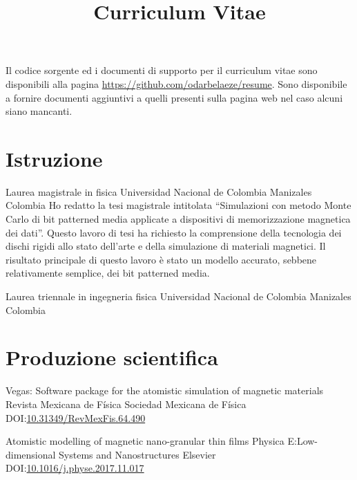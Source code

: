 \documentclass[12pt,english]{moderncv}
\title{Curriculum Vitae}
\begin{document}
\maketitle

\begin{centering}
    Il codice sorgente ed i documenti di supporto per il curriculum vitae sono disponibili alla pagina \url{https://github.com/odarbelaeze/resume}. 
    Sono disponibile a fornire documenti aggiuntivi a quelli presenti sulla pagina web nel caso alcuni siano mancanti.
\end{centering}


\section{Istruzione}

        {Laurea magistrale in fisica}
        {Universidad Nacional de Colombia}
        {Manizales}
        {Colombia}
        {%
            Ho redatto la tesi magistrale intitolata ``Simulazioni con metodo Monte Carlo di bit patterned media applicate a dispositivi di memorizzazione magnetica dei dati''.
            Questo lavoro di tesi ha richiesto la comprensione della tecnologia dei dischi rigidi  allo stato dell'arte e della simulazione di materiali magnetici.
            Il risultato principale di questo lavoro \`e stato un modello accurato, sebbene relativamente semplice, dei bit patterned media. 
        }

        {Laurea triennale in ingegneria fisica}
        {Universidad Nacional de Colombia}
        {Manizales}
        {Colombia}
        {}


\section{Produzione scientifica}

        {Vegas: Software package for the atomistic simulation of magnetic materials}
        {Revista Mexicana de Física}
        {Sociedad Mexicana de Física}
        {}
        {DOI:\@ \href{https://doi.org/10.31349/RevMexFis.64.490}{10.31349/RevMexFis.64.490}}

        {Atomistic modelling of magnetic nano-granular thin films}
        {Physica E:\@ Low-dimensional Systems and Nanostructures}
        {Elsevier}
        {}
        {DOI:\@ \href{https://doi.org/10.1016/j.physe.2017.11.017}{10.1016/j.physe.2017.11.017}}
\end{document}
